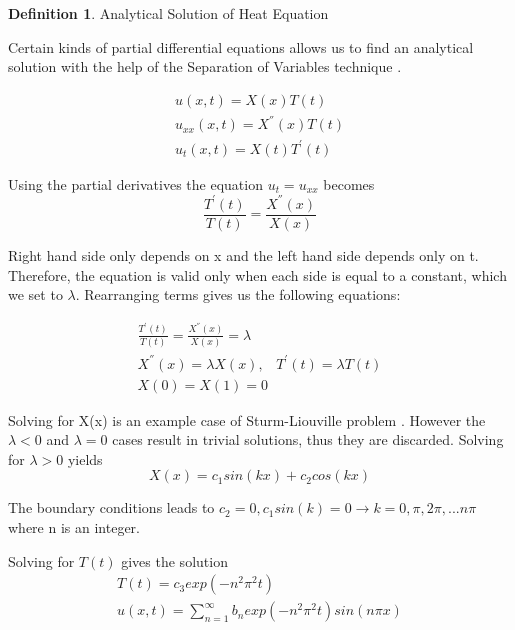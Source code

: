 \documentclass[12pt, oneside]{book}
\theoremstyle{plain}
\theoremstyle{definition}
\newtheorem{definition}[theorem]{Definition}
\begin{document}
\begin{definition} Analytical Solution of Heat Equation

Certain kinds of partial differential equations allows us to find an analytical solution with the help of the Separation of Variables technique \cite{duffyfinite}.

\begin{eqnarray}
u(x,t) = X(x) T(t) \\[10pt]
u_{xx}(x, t) = X^{''}(x) T(t) \\[10pt]
u_t (x,t) = X(t) T^{'}(t)
\end{eqnarray}

Using the partial derivatives the equation $ u_t = u_{xx} $ becomes
\begin{equation}
\frac{T^{'}(t)}{T(t)}  = \frac{X^{''}(x)}{X(x)}
\end{equation}

Right hand side only depends on x and the left hand side depends only on t. Therefore, the equation is valid only when each side is equal to a constant, which we set to $ \lambda $. Rearranging terms gives us the following equations:

\begin{eqnarray}
\frac{T^{'}(t)}{T(t)}  = \frac{X^{''}(x)}{X(x)} = \lambda \\[10pt]
X^{''}(x) = \lambda X(x), \hspace{10pt} T^{'}(t) = \lambda T(t) \\[10pt]
X(0) = X(1) = 0
\end{eqnarray}

Solving for X(x) is an example case of Sturm-Liouville problem \cite{sepvar}. However the $\lambda < 0$ and $\lambda = 0$ cases result in trivial solutions, thus they are discarded. Solving for $\lambda > 0$ yields
\begin{equation}
X(x)= c_1 sin(kx) + c_2 cos(kx)
\end{equation}

The boundary conditions leads to $ c_2 = 0, c_1 sin(k) = 0 \rightarrow k = 0, \pi, 2\pi, ...n\pi$ where n is an integer.

Solving for $T(t)$ gives the solution
\begin{eqnarray}
T(t) = c_3 exp(-n^2 \pi ^2 t) \\[10pt]
u(x,t) = \sum_{n=1}^{\infty} b_n exp(-n^2 \pi ^2 t) sin(n \pi x)
\end{eqnarray}


\end{definition}
\end{document}
